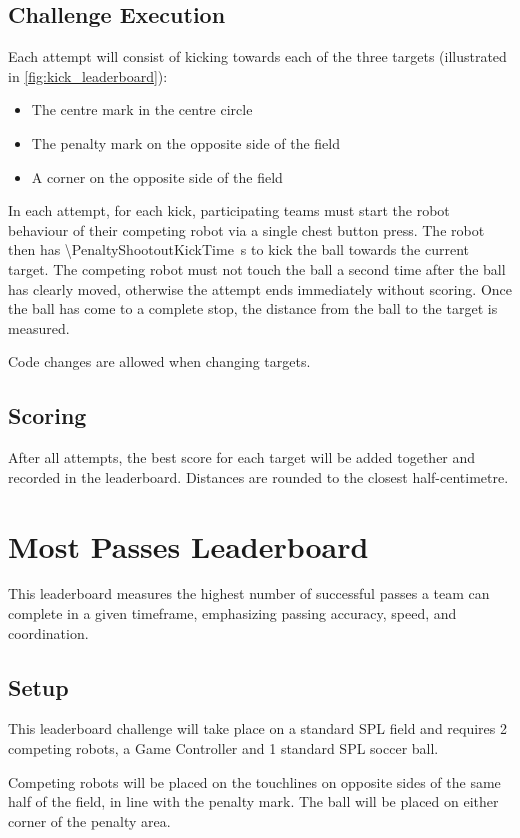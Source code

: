 \subsection{Challenge Execution}
Each attempt will consist of kicking towards each of the three targets (illustrated in \cref{fig:kick_leaderboard}):
\begin{itemize}
    \item The centre mark in the centre circle
    \item The penalty mark on the opposite side of the field
    \item A corner on the opposite side of the field
\end{itemize}
In each attempt, for each kick, participating teams must start the robot behaviour of their competing robot via a single chest button
press. The robot then has \qty{\PenaltyShootoutKickTime}{\second} to kick the ball towards the current target.
The competing robot must not touch the ball a second time after the ball has clearly moved,
otherwise the attempt ends immediately without scoring.
Once the ball has come to a complete stop, the distance from the ball to the target is measured.

Code changes are allowed when changing targets.
\subsection{Scoring}
After all attempts, the best score for each target will be added together and recorded in the leaderboard.
Distances are rounded to the closest half-centimetre.

\section{Most Passes Leaderboard}
This leaderboard measures the highest number of successful passes a team can
complete in a given timeframe, emphasizing passing accuracy, speed, and coordination.

\subsection{Setup}
This leaderboard challenge will take place on a standard SPL field and requires 2 competing robots,
a Game Controller and 1 standard SPL soccer ball.

Competing robots will be placed on the touchlines on opposite sides of the same half of the field,
in line with the penalty mark. The ball will be placed on either corner of the penalty area.

